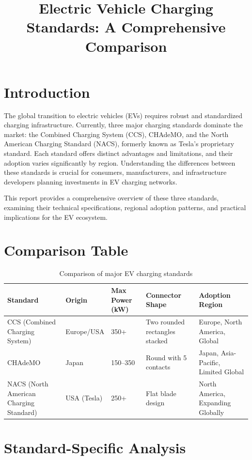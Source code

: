\documentclass[12pt]{article}
\title{Electric Vehicle Charging Standards: A Comprehensive Comparison}
\author{}
\date{}
\begin{document}
\maketitle

\section{Introduction}

The global transition to electric vehicles (EVs) requires robust and standardized charging infrastructure. Currently, three major charging standards dominate the market: the Combined Charging System (CCS), CHAdeMO, and the North American Charging Standard (NACS), formerly known as Tesla's proprietary standard. Each standard offers distinct advantages and limitations, and their adoption varies significantly by region. Understanding the differences between these standards is crucial for consumers, manufacturers, and infrastructure developers planning investments in EV charging networks.

This report provides a comprehensive overview of these three standards, examining their technical specifications, regional adoption patterns, and practical implications for the EV ecosystem.

\section{Comparison Table}

\begin{table}[h]
\centering
\begin{tabular}{|l|l|l|l|l|}
\hline
\textbf{Standard} & \textbf{Origin} & \textbf{Max Power (kW)} & \textbf{Connector Shape} & \textbf{Adoption Region} \\
\hline
CCS (Combined Charging System) & Europe/USA & 350+ & Two rounded rectangles stacked & Europe, North America, Global \\
\hline
CHAdeMO & Japan & 150--350 & Round with 5 contacts & Japan, Asia-Pacific, Limited Global \\
\hline
NACS (North American Charging Standard) & USA (Tesla) & 250+ & Flat blade design & North America, Expanding Globally \\
\hline
\end{tabular}
\caption{Comparison of major EV charging standards}
\label{tab:comparison}
\end{table}

\section{Standard-Specific Analysis}
\end{document}
